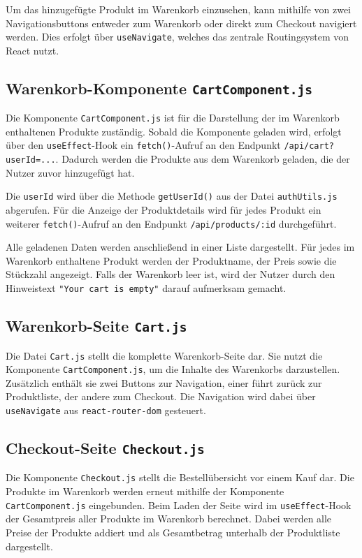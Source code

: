 \documentclass[oneside]{ausarbeitung}
\begin{document}
Um das hinzugefügte Produkt im Warenkorb einzusehen, kann mithilfe von zwei Navigationsbuttons entweder zum Warenkorb oder direkt zum Checkout navigiert werden. Dies erfolgt über \texttt{useNavigate}, welches das zentrale Routingsystem von React nutzt.

\subsection{Warenkorb-Komponente \texttt{CartComponent.js}} 

Die Komponente \texttt{CartComponent.js} ist für die Darstellung der im Warenkorb enthaltenen Produkte zuständig. Sobald die Komponente geladen wird, erfolgt über den \texttt{useEffect}-Hook ein \texttt{fetch()}-Aufruf an den Endpunkt \texttt{/api/cart?userId=...}. Dadurch werden die Produkte aus dem Warenkorb geladen, die der Nutzer zuvor hinzugefügt hat.

Die \texttt{userId} wird über die Methode \texttt{getUserId()} aus der Datei \texttt{authUtils.js} abgerufen. Für die Anzeige der Produktdetails wird für jedes Produkt ein weiterer \texttt{fetch()}-Aufruf an den Endpunkt \texttt{/api/products/:id} durchgeführt.

Alle geladenen Daten werden anschließend in einer Liste dargestellt. Für jedes im Warenkorb enthaltene Produkt werden der Produktname, der Preis sowie die Stückzahl angezeigt. Falls der Warenkorb leer ist, wird der Nutzer durch den Hinweistext \texttt{"Your cart is empty"} darauf aufmerksam gemacht.

\subsection{Warenkorb-Seite \texttt{Cart.js}} 

Die Datei \texttt{Cart.js} stellt die komplette Warenkorb-Seite dar.
Sie nutzt die Komponente \texttt{CartComponent.js}, um die Inhalte des Warenkorbs darzustellen. Zusätzlich enthält sie zwei Buttons zur Navigation, einer führt zurück zur Produktliste, der andere zum Checkout. Die Navigation wird dabei über \texttt{useNavigate} aus \texttt{react-router-dom} gesteuert.

\subsection{Checkout-Seite \texttt{Checkout.js}}

Die Komponente \texttt{Checkout.js} stellt die Bestellübersicht vor einem Kauf dar.
Die Produkte im Warenkorb werden erneut mithilfe der Komponente \texttt{CartComponent.js} eingebunden. Beim Laden der Seite wird im \texttt{useEffect}-Hook der Gesamtpreis aller Produkte im Warenkorb berechnet. Dabei werden alle Preise der Produkte addiert und als Gesamtbetrag unterhalb der Produktliste dargestellt.
\end{document}
